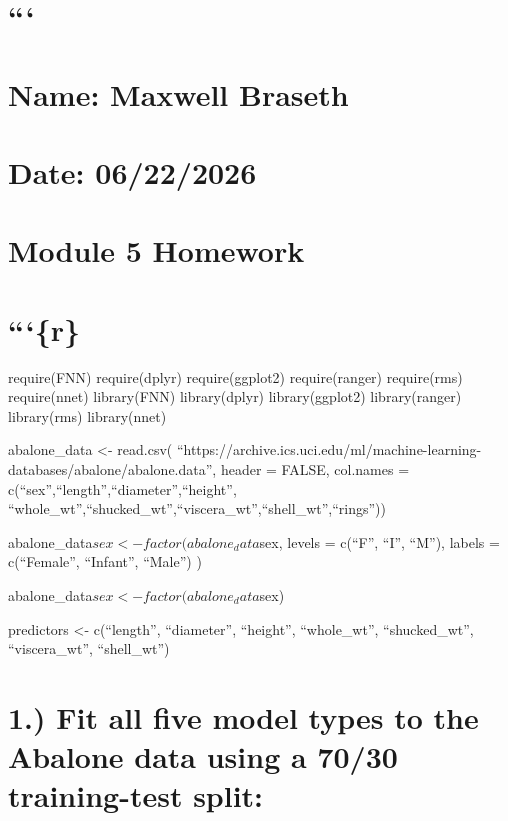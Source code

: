 \documentclass[
  letterpaper,
  DIV=11,
  numbers=noendperiod]{scrreprt}
\begin{document}
{

\chapter{```}\label{section-23}


\chapter{Name: Maxwell Braseth}\label{name-maxwell-braseth-1}


\chapter{Date: 06/22/2026}\label{date-06222026}


\chapter{Module 5 Homework}\label{module-5-homework}


\chapter{```\{r\}}\label{r-4}

require(FNN) require(dplyr) require(ggplot2) require(ranger)
require(rms) require(nnet) library(FNN) library(dplyr) library(ggplot2)
library(ranger) library(rms) library(nnet)

abalone\_data \textless- read.csv(
``https://archive.ics.uci.edu/ml/machine-learning-databases/abalone/abalone.data'',
header = FALSE, col.names =
c(``sex'',``length'',``diameter'',``height'',
``whole\_wt'',``shucked\_wt'',``viscera\_wt'',``shell\_wt'',``rings''))

abalone\_data\(sex <- factor(
  abalone_data\)sex, levels = c(``F'', ``I'', ``M''), labels =
c(``Female'', ``Infant'', ``Male'') )

abalone\_data\(sex <- factor(abalone_data\)sex)

predictors \textless- c(``length'', ``diameter'', ``height'',
``whole\_wt'', ``shucked\_wt'', ``viscera\_wt'', ``shell\_wt'')


\chapter{1.) Fit all five model types to the Abalone data using a 70/30
training-test
split:}\label{fit-all-five-model-types-to-the-abalone-data-using-a-7030-training-test-split}

}
\end{document}
